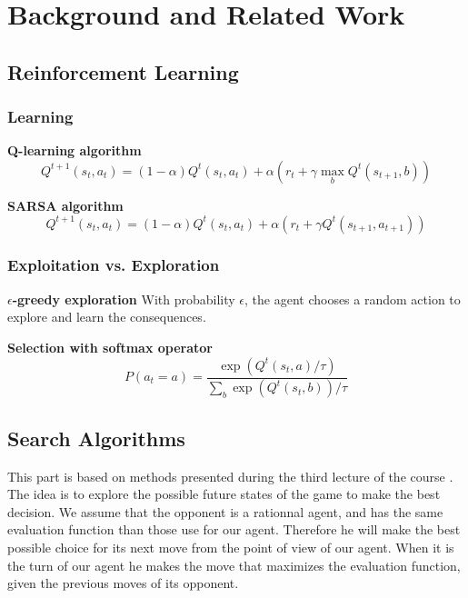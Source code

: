 \documentclass[journal, a4paper]{IEEEtran}
\begin{document}
\section{Background and Related Work}

\subsection{Reinforcement Learning}


\subsubsection{Learning}

\textbf{Q-learning algorithm}
\cite{lecture-rl}
\cite{lecture-rl2}
\cite{intro-rl}
\cite{qlearning}
\[
	Q^{t+1}(s_t, a_t) = (1-\alpha) Q^t(s_t, a_t) + \alpha (r_t + \gamma \max\limits_b Q^t(s_{t+1}, b))
\]

\textbf{SARSA algorithm}
\cite{lecture-rl}
\cite{lecture-rl2}
\cite{intro-rl}
\cite{sarsa}
\[
	Q^{t+1}(s_t, a_t) = (1-\alpha) Q^t(s_t, a_t) + \alpha (r_t + \gamma Q^t(s_{t+1}, a_{t+1}))
\]

\subsubsection{Exploitation vs. Exploration}

\textbf{$\epsilon$-greedy exploration}
\cite{lecture-rl}
\cite{lecture-rl2}
\cite{intro-rl}
With probability $\epsilon$, the agent chooses a random action to explore and learn the consequences.

\textbf{Selection with softmax operator}
\cite{intro-rl}
\[
    P\left(a_t = a\right) = \frac{\exp\left(Q^t(s_t, a) / \tau\right)}{\sum\limits_b \exp\left(Q^t(s_t, b)\right) / \tau}
\]

\subsection{Search Algorithms}
This part is based on methods presented during the third lecture of the course \cite{lecture_minimax}. The idea is to explore the possible future states of the game to make the best decision. We assume that the opponent is a rationnal agent, and has the same evaluation function than those use for our agent. Therefore he will make the best possible choice for its next move from the point of view of our agent. When it is the turn of our agent he makes the move that maximizes the evaluation function, given the previous moves of its opponent.
\end{document}
